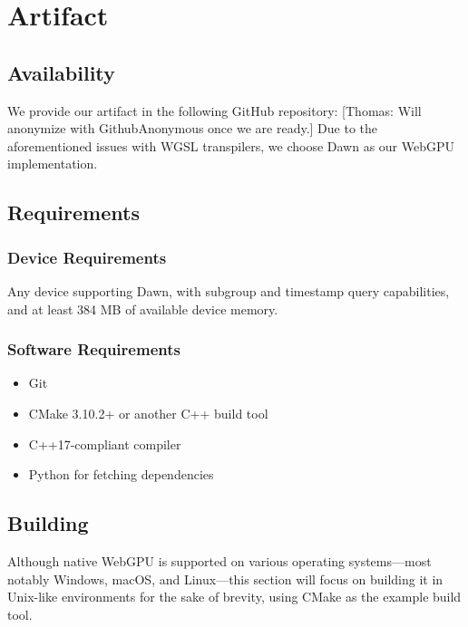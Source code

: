 \documentclass[sigconf]{acmart}
\newcommand{\thomas}[1]{{\footnotesize\color{orange}[Thomas: #1]}}
\begin{document}



\appendix
\section{Artifact}

\subsection{Availability}
We provide our artifact in the following GitHub repository: 
\thomas{Will anonymize with GithubAnonymous once we are ready.} 
Due to the aforementioned issues with WGSL transpilers, we choose Dawn as our WebGPU implementation.

\subsection{Requirements}

\subsubsection{Device Requirements}
Any device supporting Dawn, with subgroup and timestamp query capabilities, and at least 384 MB of available device memory.

\subsubsection{Software Requirements}
\begin{itemize}
  \item Git
  \item CMake 3.10.2+ or another C++ build tool
  \item C++17-compliant compiler
  \item Python for fetching dependencies
\end{itemize}

\subsection{Building}
Although native WebGPU is supported on various operating systems—most notably Windows, macOS, and Linux—this section will focus on building it in Unix-like environments for the sake of brevity, using CMake as the example build tool.
\end{document}
